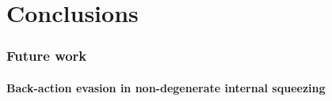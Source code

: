 \chapter{Conclusions}




\subsection{Future work}


\subsubsection*{Back-action evasion in non-degenerate internal squeezing}



